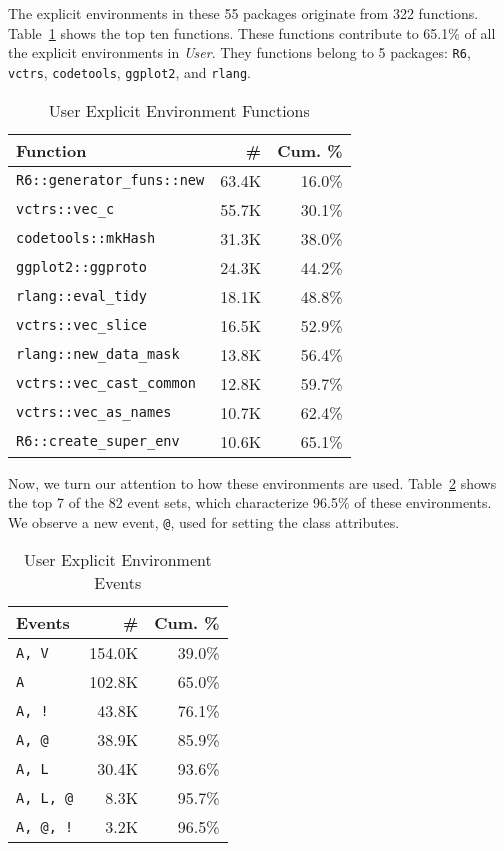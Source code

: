 \documentclass[10pt,review,sigplan,anonymous=true,authorversion=true,nonacm=true]{acmart}
\newcommand{\code}[1]{\lstinline |#1|\xspace}
\begin{document}
The explicit environments in these 55 packages originate from 322 functions.
Table~\ref{table:user_explicit_fun} shows the top ten functions. These functions
contribute to 65.1\% of all the explicit environments in \emph{User}. They
functions belong to 5 packages: \code{R6}, \code{vctrs}, \code{codetools},
\code{ggplot2}, and \code{rlang}.

\begin{table}[!h]
  \small
  \caption{User Explicit Environment Functions} \label{table:user_explicit_fun}
  \centering
  \begin{tabular}{lrr}
    \toprule
    \textbf{Function}&\textbf{\#}&\textbf{Cum. \%}\\
    \midrule
    \code{R6::generator_funs::new}&63.4K&16.0\%\\
    \code{vctrs::vec_c}&55.7K&30.1\%\\
    \code{codetools::mkHash}&31.3K&38.0\%\\
    \code{ggplot2::ggproto}&24.3K&44.2\%\\
    \code{rlang::eval_tidy}&18.1K&48.8\%\\
    \code{vctrs::vec_slice}&16.5K&52.9\%\\
    \code{rlang::new_data_mask}&13.8K&56.4\%\\
    \code{vctrs::vec_cast_common}&12.8K&59.7\%\\
    \code{vctrs::vec_as_names}&10.7K&62.4\%\\
    \code{R6::create_super_env}&10.6K&65.1\%\\
    \bottomrule
  \end{tabular}
\end{table}

Now, we turn our attention to how these environments are used.
Table~\ref{table:user_explicit_env_seq} shows the top 7 of the 82 event sets,
which characterize 96.5\% of these environments. We observe a new event,
\texttt{@}, used for setting the class attributes.

\begin{table}[!h]
  \small
  \caption{User Explicit Environment Events} \label{table:user_explicit_env_seq}
  \centering
  \begin{tabular}{lrr}
    \toprule
    \textbf{Events}&\textbf{\#}&\textbf{Cum. \%}\\
    \midrule
    \texttt{A, V}&154.0K&39.0\%\\
    \texttt{A}&102.8K&65.0\%\\
    \texttt{A, !}&43.8K&76.1\%\\
    \texttt{A, @}&38.9K&85.9\%\\
    \texttt{A, L}&30.4K&93.6\%\\
    \texttt{A, L, @}&8.3K&95.7\%\\
    \texttt{A, @, !}&3.2K&96.5\%\\
    \bottomrule
  \end{tabular}
\end{table}
\end{document}
